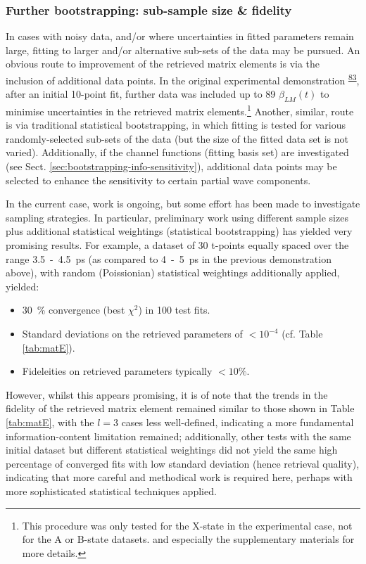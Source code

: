 \documentclass[10pt]{article}
\begin{document}

\subsubsection{Further bootstrapping: sub-sample size \& fidelity}

In cases with noisy data, and/or where uncertainties in fitted parameters remain large, fitting to larger and/or alternative sub-sets of the data may be pursued.
An obvious route to improvement of the retrieved matrix elements is via the inclusion of additional data points. In the original experimental demonstration \textsuperscript{\hyperref[csl:83]{83}}, after an initial 10-point fit, further data was included up to 89 $\beta_{LM}(t)$ to minimise uncertainties in the retrieved matrix elements.\footnote{This procedure was only tested for the X-state in the experimental case, not for the A or B-state datasets. %
and especially the supplementary materials for more details.} Another, similar, route is via traditional statistical bootstrapping, in which fitting is tested for various randomly-selected sub-sets of the data (but the size of the fitted data set is not varied). Additionally, if the channel functions (fitting basis set) are investigated (see Sect. \ref{sec:bootstrapping-info-sensitivity}), additional data points may be selected to enhance the sensitivity to certain partial wave components.

In the current case, work is ongoing, %
but some effort has been made to investigate sampling strategies. In particular, preliminary work using different sample sizes plus additional statistical weightings (statistical bootstrapping) has yielded very promising results. For example, a dataset of 30 t-points equally spaced over the range 3.5~-~4.5~ps (as compared to 4~-~5~ps in the previous demonstration above), with random (Poissionian) statistical weightings additionally applied, yielded:

\begin{itemize}
\item 30~\% convergence (best $\chi^2$) in 100 test fits.
\item Standard deviations on the retrieved parameters of $<10^{-4}$ (cf. Table \ref{tab:matE}).
\item Fideleities on retrieved parameters typically $<10\%$.
\end{itemize}

However, whilst this appears promising, it is of note that the trends in the fidelity of the retrieved matrix element remained similar to those shown in Table \ref{tab:matE}, with the $l=3$ cases less well-defined, indicating a more fundamental information-content limitation remained; additionally, other tests with the same initial dataset but different statistical weightings did not yield the same high percentage of converged fits with low standard deviation (hence retrieval quality), indicating that more careful and methodical work is required here, perhaps with more sophisticated statistical techniques applied.
\end{document}
